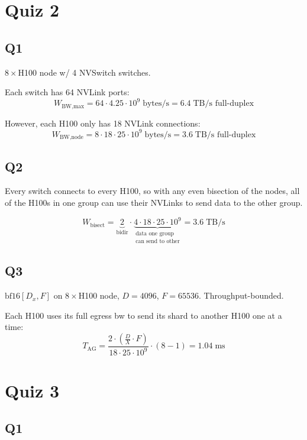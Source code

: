 \documentclass[11pt]{article}
\begin{document}
\section*{Quiz 2}

\subsection*{Q1}

$8 \times$H100 node w/ 4 NVSwitch switches.

Each switch has 64 NVLink ports:
\[
W_{\text{BW,max}} = 64 \cdot 4.25 \cdot 10^9 \;\text{bytes/s} = 6.4 \;\text{TB/s full-duplex}
\]

However, each H100 only has 18 NVLink connections:
\[
W_{\text{BW,node}} = 8 \cdot 18 \cdot 25 \cdot 10^9 \;\text{bytes/s} = 3.6 \;\text{TB/s full-duplex}
\]

\subsection*{Q2}

Every switch connects to every H100, so with any even bisection of the nodes, all of the H100s in one group can use their NVLinks to send data to the other group.

\[
W_{\text{bisect}} = \underbrace{2}_{\text{bidir}} \cdot \underbrace{4 \cdot 18 \cdot 25 \cdot 10^9}_{\substack{\text{data one group}\\\text{can send to other}}} = 3.6 \;\text{TB/s}
\]

\subsection*{Q3}

$\text{bf16}[D_x, F]$ on $8 \times$H100 node, $D = 4096$, $F = 65536$. Throughput-bounded.

Each H100 uses its full egress bw to send its shard to another H100 one at a time:
\[
T_{\text{AG}} = \frac{2 \cdot \left(\frac{D}{X} \cdot F\right)}{18 \cdot 25 \cdot 10^9} \cdot (8 - 1) = 1.04 \;\text{ms}
\]

\section*{Quiz 3}

\subsection*{Q1}
\end{document}
